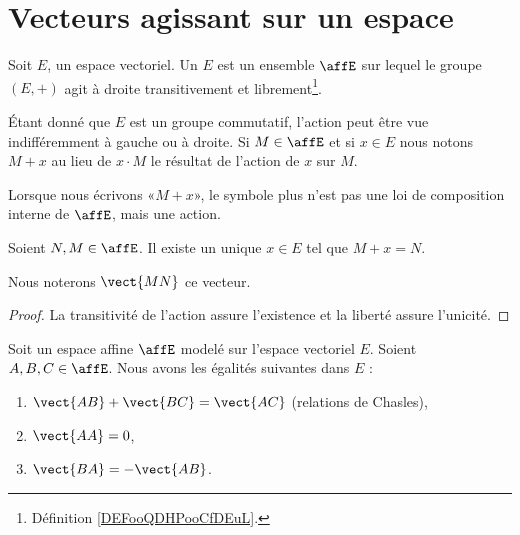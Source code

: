 
\section{Vecteurs agissant sur un espace}

\begin{definition}
	Soit \( E\), un espace vectoriel. Un  \( E\) est un ensemble \( \affE\) sur lequel le groupe \( (E,+)\) agit à droite transitivement et librement\footnote{Définition \ref{DEFooQDHPooCfDEuL}.}.
\end{definition}

Étant donné que \( E\) est un groupe commutatif, l'action peut être vue indifféremment à gauche ou à droite. Si \( M\in\affE\) et si \( x\in E\) nous notons \( M+x\) au lieu de \( x\cdot M\) le résultat de l'action de \( x\) sur \( M\).

\begin{normaltext}      \label{NORMooZANAooQdXqlh}
	Lorsque nous écrivons «\( M+x\)», le symbole plus n'est pas une loi de composition interne de \( \affE\), mais une action.
\end{normaltext}

\begin{propositionDef}      \label{DEFooWAYTooMLbqEE}
	Soient \( N,M\in\affE\). Il existe un unique \( x\in E\) tel que \( M+x=N\).

	Nous noterons \( \vect{ MN }\) ce vecteur.
\end{propositionDef}

\begin{proof}
	La transitivité de l'action assure l'existence et la liberté assure l'unicité.
\end{proof}

\begin{proposition}     \label{PROPooCOZCooCghwaR}
	Soit un espace affine \( \affE\) modelé sur l'espace vectoriel \( E\). Soient \( A,B,C\in \affE\). Nous avons les égalités suivantes dans \( E\) :
	\begin{enumerate}
		\item   \label{ITEMooSDMIooUQiKeW}
		      \( \vect{ AB }+\vect{ BC }=\vect{ AC }\) (relations de Chasles),
		\item   \label{ITEMooWZAVooGfGBwd}
		      \( \vect{ AA }=0\),
		\item   \label{ITEMooLDVXooFZMbsQ}
		      \( \vect{ BA }=-\vect{ AB }\).
	\end{enumerate}
\end{proposition}


